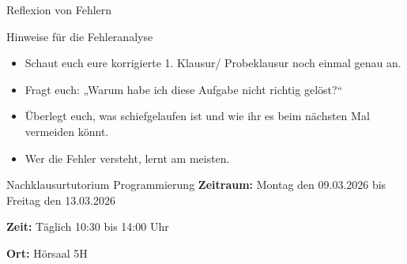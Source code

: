 \begin{frame}{Reflexion von Fehlern}
\begin{exampleblock}{Hinweise für die Fehleranalyse}
  \begin{itemize}
    \item Schaut euch eure korrigierte 1. Klausur/ Probeklausur noch einmal genau an.
    \item Fragt euch: „Warum habe ich diese Aufgabe nicht richtig gelöst?“
    \item Überlegt euch, was schiefgelaufen ist und wie ihr es beim nächsten Mal vermeiden könnt.
    \item Wer die Fehler versteht, lernt am meisten.
  \end{itemize}
\end{exampleblock}
\end{frame}


\begin{frame}{Nachklausurtutorium Programmierung}
  \textbf{Zeitraum:} Montag den 09.03.2026 bis Freitag den 13.03.2026

  \textbf{Zeit:} Täglich 10:30 bis 14:00 Uhr

  \textbf{Ort:} Hörsaal 5H

  \vspace{0.5cm}

\end{frame}